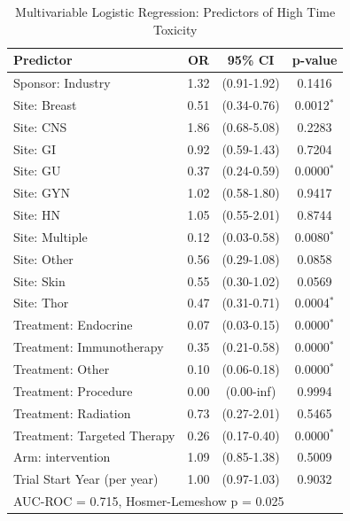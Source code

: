 \begin{table}[htbp]
\centering
\caption{Multivariable Logistic Regression: Predictors of High Time Toxicity}
\begin{tabular}{lccc}
\toprule
Predictor & OR & 95\% CI & p-value \\
\midrule
Sponsor: Industry & 1.32 & (0.91-1.92) & 0.1416 \\
Site: Breast & 0.51 & (0.34-0.76) & 0.0012$^*$ \\
Site: CNS & 1.86 & (0.68-5.08) & 0.2283 \\
Site: GI & 0.92 & (0.59-1.43) & 0.7204 \\
Site: GU & 0.37 & (0.24-0.59) & 0.0000$^*$ \\
Site: GYN & 1.02 & (0.58-1.80) & 0.9417 \\
Site: HN & 1.05 & (0.55-2.01) & 0.8744 \\
Site: Multiple & 0.12 & (0.03-0.58) & 0.0080$^*$ \\
Site: Other & 0.56 & (0.29-1.08) & 0.0858 \\
Site: Skin & 0.55 & (0.30-1.02) & 0.0569 \\
Site: Thor & 0.47 & (0.31-0.71) & 0.0004$^*$ \\
Treatment: Endocrine & 0.07 & (0.03-0.15) & 0.0000$^*$ \\
Treatment: Immunotherapy & 0.35 & (0.21-0.58) & 0.0000$^*$ \\
Treatment: Other & 0.10 & (0.06-0.18) & 0.0000$^*$ \\
Treatment: Procedure & 0.00 & (0.00-inf) & 0.9994 \\
Treatment: Radiation & 0.73 & (0.27-2.01) & 0.5465 \\
Treatment: Targeted Therapy & 0.26 & (0.17-0.40) & 0.0000$^*$ \\
Arm: intervention & 1.09 & (0.85-1.38) & 0.5009 \\
Trial Start Year (per year) & 1.00 & (0.97-1.03) & 0.9032 \\
\bottomrule
\multicolumn{4}{l}{\footnotesize AUC-ROC = 0.715, Hosmer-Lemeshow p = 0.025} \\
\end{tabular}
\end{table}
